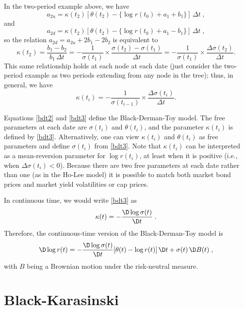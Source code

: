 In the two-period example above, we have
$$a_{2u} = \kappa(t_2)[\theta(t_2) - \{\log r(t_0) +a_1+b_1\}]\,\varDelta t\; ,$$
and
$$a_{2d} = \kappa(t_2)[\theta(t_2) - \{\log r(t_0) +a_1-b_1\}]\,\varDelta t\; ,$$
so the relation $a_{2d} = a_{2u} + 2b_1-2b_2$ is equivalent to
\begin{equation}\label{bdt4}
\kappa(t_2) = \frac{b_1-b_2}{b_1\,\varDelta t} = - \frac{1}{\sigma(t_1)}\times\frac{\sigma(t_2)-\sigma(t_1)}{\varDelta t} = - \frac{1}{\sigma(t_1)}\times\frac{\varDelta \sigma(t_2)}{\varDelta t}.
\end{equation}
This same relationship holds at each node at each date  (just consider the two-period example as two periods extending from any node in the tree); thus, in general, we have
\begin{equation}\label{bdt3}
\kappa(t_i) = - \frac{1}{\sigma(t_{i-1})}\times\frac{\varDelta \sigma(t_i)}{\varDelta t}.
\end{equation}

Equations \eqref{bdt2} and \eqref{bdt3} define the Black-Derman-Toy model.  The free parameters at each date are $\sigma(t_i)$ and $\theta(t_i)$, and the parameter $\kappa(t_i)$ is defined by \eqref{bdt3}.  Alternatively, one can view $\kappa(t_i)$ and $\theta(t_i)$ as free parameters and define $\sigma(t_i)$ from \eqref{bdt3}.  Note that $\kappa(t_i)$ can be interpreted as a mean-reversion parameter for $\log r(t_i)$, at least when it is positive (i.e., when $\varDelta \sigma(t_i)<0$).  Because there are two free parameters at each date rather than one (as in the Ho-Lee model)  it is possible to match both market bond prices and market yield volatilities or cap prices.

In continuous time, we would write  \eqref{bdt3} as
$$\kappa(t) = -\frac{\D \log \sigma(t)}{\D t}\; .$$
Therefore, the continuous-time version of the Black-Derman-Toy model is
$$\D \log r(t) = -\frac{\D \log \sigma(t)}{\D t}[\theta(t)-\log r(t)]\,\D t + \sigma(t)\,\D B(t)\; ,$$
with $B$ being a Brownian motion under the risk-neutral measure.





\section{Black-Karasinski}

